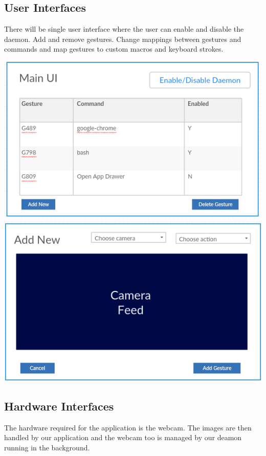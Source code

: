 \documentclass[11pt]{report}
\begin{document}
\subsection{User Interfaces}
There will be single user interface where the user can enable and disable the daemon. Add and remove gestures. Change mappings between gestures and commands and map gestures to custom macros and keyboard strokes.
\\
\begin{center}
    \includegraphics[scale=0.8]{mainui.png}
    \\
    \includegraphics[scale=0.8]{addnewui.png}
\end{center}


\subsection{Hardware Interfaces}
The hardware required for the application is the webcam. The images are then handled by our application and the webcam too is managed by our deamon running in the background.
\end{document}
